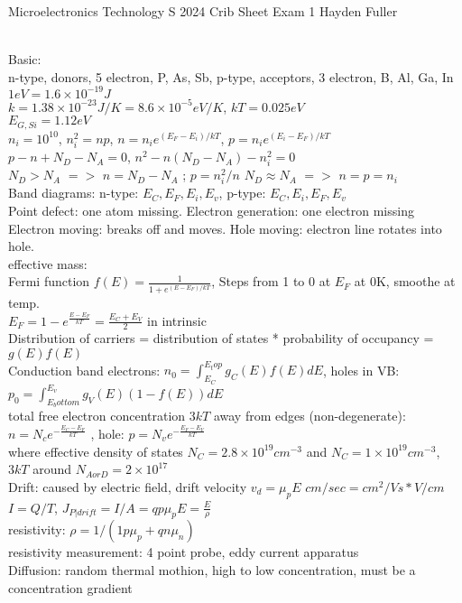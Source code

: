 \documentclass{article}
\begin{document}
Microelectronics Technology S 2024 Crib Sheet Exam 1 Hayden Fuller
\begin{large}
\\Basic:
\\n-type, donors, 5 electron, P, As, Sb,    p-type, acceptors, 3 electron, B, Al, Ga, In
\\$1eV=1.6\times10^{-19}J$
\\$k=1.38\times10^{-23}J/K=8.6\times10^{-5}eV/K$, $kT=0.025eV$
\\$E_{G,Si}=1.12eV$
\\$n_i=10^{10}$, $n_i^2=np$, $n=n_ie^{(E_F-E_i)/kT}$, $p=n_ie^{(E_i-E_F)/kT}$
\\$p-n+N_D-N_A=0$, $n^2-n(N_D-N_A)-n_i^2=0$
\\$N_D>N_A$ $= >$ $n=N_D-N_A$ ; $p=n_i^2/n$     $N_D\approx N_A$ $= >$ $n=p=n_i$
\\Band diagrams: n-type: $E_C, E_F, E_i, E_v$,   p-type: $E_C, E_i, E_F, E_v$
\\Point defect: one atom missing. Electron generation: one electron missing
\\Electron moving: breaks off and moves. Hole moving: electron line rotates into hole.
\\effective mass: 
\\Fermi function $f(E)=\frac{1}{1+e^{(E-E_F)/kT}}$, Steps from 1 to 0 at $E_F$ at 0K, smoothe at temp.
\\$E_F=1-e^{\frac{E-E_F}{kT}}=\frac{E_C+E_V}{2}$ in intrinsic
\\Distribution of carriers = distribution of states * probability of occupancy = $g(E) f(E)$
\\Conduction band electrons: $n_0=\int_{E_C}^{E_top} g_C(E)f(E)dE$, holes in VB: $p_0=\int_{E_bottom}^{E_v} g_V(E)(1-f(E))dE$
\\total free electron concentration $3kT$ away from edges (non-degenerate): $n=N_ce^{-\frac{E_C-E_F}{kT}}$ , hole: $p=N_ve^{-\frac{E_F-E_V}{kT}}$
\\where effective density of states $N_ C=2.8\times10^{19}cm^{-3}$ and $N_ C=1\times10^{19}cm^{-3}$, $3kT$ around $N_{A or D}=2\times10^{17}$
\\Drift:  caused by electric field, drift velocity $v_d=\mu_p E$  $cm/sec=cm^2/Vs * V/cm$
\\$I=Q/T$, $J_{P|drift}=I/A=qp\mu_pE=\frac{E}{\rho}$
\\resistivity: $\rho=1/(1p\mu_p+qn\mu_n)$
\\resistivity measurement: 4 point probe, eddy current apparatus
\\Diffusion: random thermal mothion, high to low concentration, must be a concentration gradient

\end{large}
\end{document}
